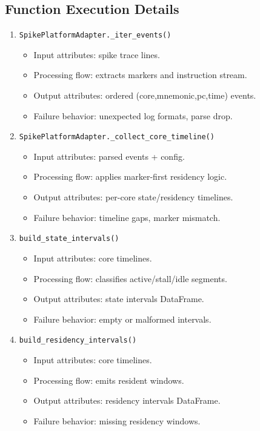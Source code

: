 \documentclass[11pt,a4paper]{article}
\begin{document}
\subsection*{Function Execution Details}
\begin{enumerate}[leftmargin=*]
  \item \texttt{SpikePlatformAdapter.\_iter\_events()}
  \begin{itemize}[leftmargin=*]
    \item Input attributes: spike trace lines.
    \item Processing flow: extracts markers and instruction stream.
    \item Output attributes: ordered (core,mnemonic,pc,time) events.
    \item Failure behavior: unexpected log formats, parse drop.
  \end{itemize}
  \item \texttt{SpikePlatformAdapter.\_collect\_core\_timeline()}
  \begin{itemize}[leftmargin=*]
    \item Input attributes: parsed events + config.
    \item Processing flow: applies marker-first residency logic.
    \item Output attributes: per-core state/residency timelines.
    \item Failure behavior: timeline gaps, marker mismatch.
  \end{itemize}
  \item \texttt{build\_state\_intervals()}
  \begin{itemize}[leftmargin=*]
    \item Input attributes: core timelines.
    \item Processing flow: classifies active/stall/idle segments.
    \item Output attributes: state intervals DataFrame.
    \item Failure behavior: empty or malformed intervals.
  \end{itemize}
  \item \texttt{build\_residency\_intervals()}
  \begin{itemize}[leftmargin=*]
    \item Input attributes: core timelines.
    \item Processing flow: emits resident windows.
    \item Output attributes: residency intervals DataFrame.
    \item Failure behavior: missing residency windows.

\end{itemize}
\end{enumerate}
\end{document}
